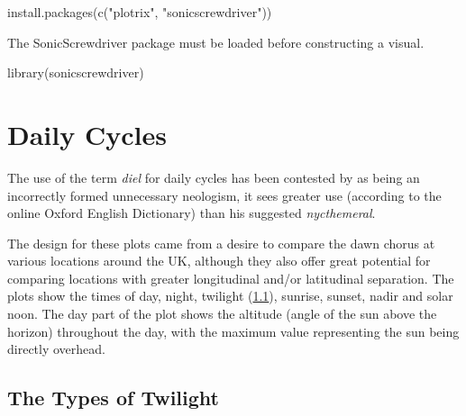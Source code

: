 \documentclass[
]{book}
\newenvironment{Shaded}{\begin{snugshade}}{\end{snugshade}}
\newcommand{\FunctionTok}[1]{\textcolor[rgb]{0.00,0.00,0.00}{#1}}
\newcommand{\NormalTok}[1]{#1}
\newcommand{\StringTok}[1]{\textcolor[rgb]{0.31,0.60,0.02}{#1}}
\begin{document}
\begin{Shaded}
\begin{Highlighting}[]
\FunctionTok{install.packages}\NormalTok{(}\FunctionTok{c}\NormalTok{(}\StringTok{"plotrix"}\NormalTok{, }\StringTok{"sonicscrewdriver"}\NormalTok{))}
\end{Highlighting}
\end{Shaded}

The SonicScrewdriver package must be loaded before constructing a visual.

\begin{Shaded}
\begin{Highlighting}[]
\FunctionTok{library}\NormalTok{(sonicscrewdriver)}
\end{Highlighting}
\end{Shaded}

\hypertarget{daily-cycles}{%
\section{Daily Cycles}\label{daily-cycles}}

The use of the term \emph{diel} for daily cycles has been contested by \citet{broughton1963} as being an incorrectly formed unnecessary neologism, it sees greater use (according to the online Oxford English Dictionary) than his suggested \emph{nycthemeral}.

The design for these plots came from a desire to compare the dawn chorus at various locations around the UK, although they also offer great potential for comparing locations with greater longitudinal and/or latitudinal separation. The plots show the times of day, night, twilight (\ref{twilight-types}), sunrise, sunset, nadir and solar noon. The day part of the plot shows the altitude (angle of the sun above the horizon) throughout the day, with the maximum value representing the sun being directly overhead.

\hypertarget{twilight-types}{%
\subsection{The Types of Twilight}\label{twilight-types}}
\end{document}

